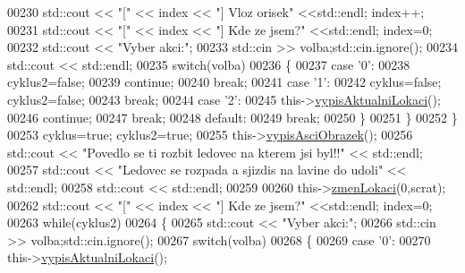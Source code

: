 \begin{DoxyCode}
00230             std::cout << \textcolor{stringliteral}{"["} << index << \textcolor{stringliteral}{"] Vloz orisek"} <<std::endl; index++;
00231             std::cout << \textcolor{stringliteral}{"["} << index << \textcolor{stringliteral}{"] Kde ze jsem?"} <<std::endl; index=0;
00232             std::cout << \textcolor{stringliteral}{"Vyber akci:"};
00233             std::cin >> volba;std::cin.ignore();
00234             std::cout << std::endl;
00235             \textcolor{keywordflow}{switch}(volba)
00236             \{
00237                 \textcolor{keywordflow}{case} \textcolor{charliteral}{'0'}:
00238                     cyklus2=\textcolor{keyword}{false};
00239                     \textcolor{keywordflow}{continue};
00240                     \textcolor{keywordflow}{break};
00241                 \textcolor{keywordflow}{case} \textcolor{charliteral}{'1'}:
00242                     cyklus=\textcolor{keyword}{false}; cyklus2=\textcolor{keyword}{false};
00243                     \textcolor{keywordflow}{break};
00244                 \textcolor{keywordflow}{case} \textcolor{charliteral}{'2'}:
00245                     this->\hyperlink{classIceAge_1_1Hra_af0fafa4884c5107939edc907cc7de1a9}{vypisAktualniLokaci}();
00246                     \textcolor{keywordflow}{continue};
00247                     \textcolor{keywordflow}{break};
00248                 \textcolor{keywordflow}{default}:
00249                     \textcolor{keywordflow}{break};
00250             \}
00251         \}
00252     \}
00253     cyklus=\textcolor{keyword}{true}; cyklus2=\textcolor{keyword}{true}; 
00255     this->\hyperlink{classIceAge_1_1Hra_a28f302456724c7a0901e16a940ea6c67}{vypisAsciObrazek}(); 
00256     std::cout << \textcolor{stringliteral}{"Povedlo se ti rozbit ledovec na kterem jsi byl!!"} << std::endl;
00257     std::cout << \textcolor{stringliteral}{"Ledovec se rozpada a sjizdis na lavine do udoli"} << std::endl;
00258     std::cout << std::endl;
00259 
00260     this->\hyperlink{classIceAge_1_1Hra_a9429d4476f187d8a80dde5944704fab7}{zmenLokaci}(0,scrat); 
00262     std::cout << \textcolor{stringliteral}{"["} << index << \textcolor{stringliteral}{"] Kde ze jsem?"} <<std::endl; index=0;
00263     \textcolor{keywordflow}{while}(cyklus2)
00264     \{
00265             std::cout << \textcolor{stringliteral}{"Vyber akci:"};
00266             std::cin >> volba;std::cin.ignore();
00267             \textcolor{keywordflow}{switch}(volba)
00268             \{
00269                 \textcolor{keywordflow}{case} \textcolor{charliteral}{'0'}:
00270                     this->\hyperlink{classIceAge_1_1Hra_af0fafa4884c5107939edc907cc7de1a9}{vypisAktualniLokaci}();

\end{DoxyCode}
